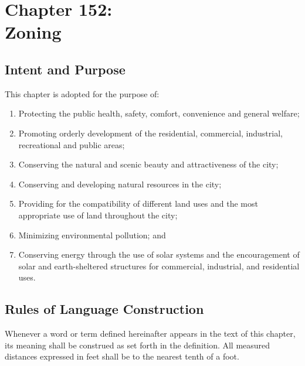\chapter*{Chapter 152: \\
	Zoning}
    \vfill
    \minitoc
    \pagebreak


\section{Intent and Purpose}
This chapter is adopted for the purpose of:
\begin{enumerate}[{\indent}A)]
    \item Protecting the public health, safety, comfort, convenience and general welfare; 
    \item Promoting orderly development of the residential, commercial, industrial, recreational and public areas; 
    \item Conserving the natural and scenic beauty and attractiveness of the city; 
    \item Conserving and developing natural resources in the city; 
    \item Providing for the compatibility of different land uses and the most appropriate use of land throughout the city; 
    \item Minimizing environmental pollution; and
    \item Conserving energy through the use of solar systems and the encouragement of solar and earth-sheltered structures for commercial, industrial, and residential uses.
\end{enumerate}

\section{Rules of Language Construction}
Whenever a word or term defined hereinafter appears in the text of this chapter, its meaning shall be construed as set forth in the definition. All measured distances expressed in feet shall be to the nearest tenth of a foot.

